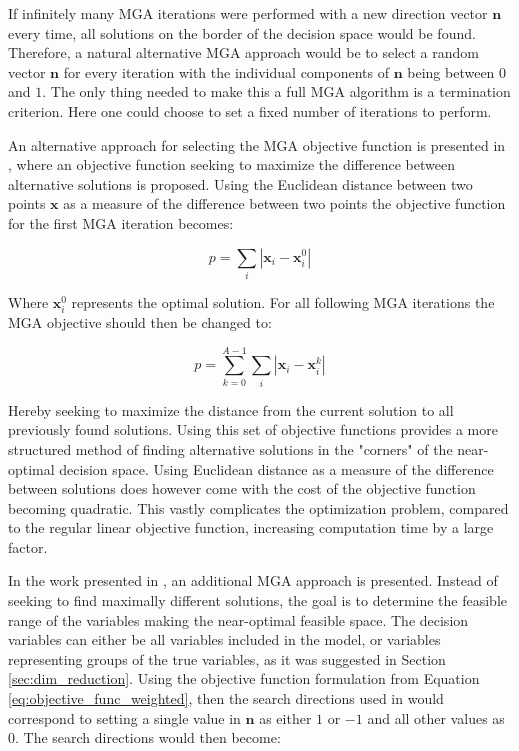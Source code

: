 If infinitely many MGA iterations were performed with a new direction vector $\mathbf{n}$ every time, all solutions on the border of the decision space would be found. Therefore, a natural alternative MGA approach would be to select a random vector $\mathbf{n}$ for every iteration with the individual components of $\mathbf{n}$ being between $0$ and $1$. 
The only thing needed to make this a full MGA algorithm is a termination criterion. Here one could choose to set a fixed number of iterations to perform. 

An alternative approach for selecting the MGA objective function is presented in \cite{Genetic_Algorithms_for_MGA}, where an objective function seeking to maximize the difference between alternative solutions is proposed. Using the Euclidean distance between two points $\mathbf{x}$ as a measure of the difference between two points the objective function for the first MGA iteration becomes: 

\begin{equation}\label{eq:MGA_max_diff_1}
p = \sum_i |\mathbf{x}_i - \mathbf{x}_i^0|
\end{equation}

Where $\mathbf{x}_i^0$ represents the optimal solution. For all following MGA iterations the MGA objective should then be changed to:

\begin{equation}\label{eq:MGA_max_diff_2}
p = \sum_{k=0}^{A-1} \sum_i |\mathbf{x}_i - \mathbf{x}_i^k|
\end{equation}

Hereby seeking to maximize the distance from the current solution to all previously found solutions. Using this set of objective functions provides a more structured method of finding alternative solutions in the "corners" of the near-optimal decision space. Using Euclidean distance as a measure of the difference between solutions does however come with the cost of the objective function becoming quadratic. This vastly complicates the optimization problem, compared to the regular linear objective function, increasing computation time by a large factor. 

In the work presented in \cite{Fabian_MGA}, an additional MGA approach is presented. Instead of seeking to find maximally different solutions, the goal is to determine the feasible range of the variables making the near-optimal feasible space. The decision variables can either be all variables included in the model, or variables representing groups of the true variables, as it was suggested in Section \ref{sec:dim_reduction}. Using the objective function formulation from Equation \ref{eq:objective_func_weighted}, then the search directions used in \cite{Fabian_MGA} would correspond to setting a single value in $\mathbf{n}$ as either $1$ or $-1$ and all other values as $0$. The search directions would then become:

